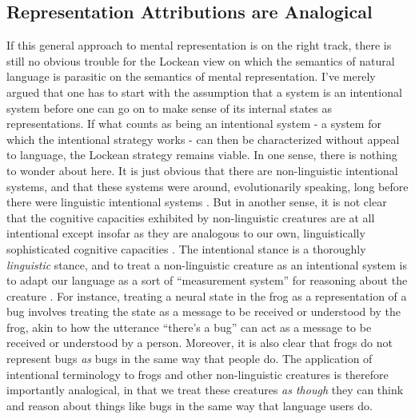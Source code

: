 \subsection{Representation Attributions are Analogical}

If this general approach to mental representation is on the right track, there is still no obvious trouble for the Lockean view on which the semantics of natural language is parasitic on the semantics of mental representation. I've merely argued that one has to start with the assumption that a system is an intentional system before one can go on to make sense of its internal states as representations. If what counts as being an intentional system - a system for which the intentional strategy works - can then be characterized without appeal to language, the Lockean strategy remains viable. In one sense, there is nothing to wonder about here. It is just obvious that there are non-linguistic intentional systems, and that these systems were around, evolutionarily speaking, long before there were linguistic intentional systems \citep{Dennett:2010,Brandom:1994}. But in another sense, it is not clear that the cognitive capacities exhibited by non-linguistic creatures are at all intentional except insofar as they are analogous to our own, linguistically sophisticated cognitive capacities \citep{Brandom:1994,Brandom:2010}. The intentional stance is a thoroughly \textit{linguistic} stance, and to treat a non-linguistic creature as an intentional system is to adapt our language as a sort of ``measurement system'' for reasoning about the creature \citep[][p. 306]{Brandom:2010}. For instance, treating a neural state in the frog as a representation of a bug involves treating the state as a message to be received or understood by the frog, akin to how the utterance ``there's a bug'' can act as a message to be received or understood by a person. Moreover, it is also clear that frogs do not represent bugs \textit{as} bugs in the same way that people do. The application of intentional terminology to frogs and other non-linguistic creatures is therefore importantly analogical, in that we treat these creatures \textit{as though} they can think and reason about things like bugs in the same way that language users do.

